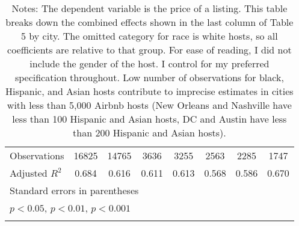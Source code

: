 {\begin{longtable}{l*{7}{c}}
Observations        &       16825         &       14765         &        3636         &        3255         &        2563         &        2285         &        1747         \\
Adjusted \(R^{2}\)  &       0.684         &       0.616         &       0.611         &       0.613         &       0.568         &       0.586         &       0.670         \\
\hline\hline
\multicolumn{8}{l}{\footnotesize Standard errors in parentheses}\\
\multicolumn{8}{l}{\footnotesize \sym{*} \(p<0.05\), \sym{**} \(p<0.01\), \sym{***} \(p<0.001\)}\\
\caption*{Notes: The dependent variable is the price of a listing. This table breaks down the combined effects shown in the last column of Table 5 by city. The omitted category for race is white hosts, so all coefficients are relative to that group. For ease of reading, I did not include the gender of the host. I control for my preferred specification throughout. Low number of observations for black, Hispanic, and Asian hosts contribute to imprecise estimates in cities with less than 5,000 Airbnb hosts (New Orleans and Nashville have less than 100 Hispanic and Asian hosts, DC and Austin have less than 200 Hispanic and Asian hosts).}
\end{longtable}
}



